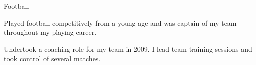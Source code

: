 \begin{cventries}
  \cventry
    {Football}
    {}
    {}
    {}
    {
      \begin{cvitems}
        \item {Played football competitively from a young age and was captain of my team throughout my playing career.}
        \item {Undertook a coaching role for my team in 2009. I lead team training sessions and took control of several matches.}
      \end{cvitems}
    }
\end{cventries}
